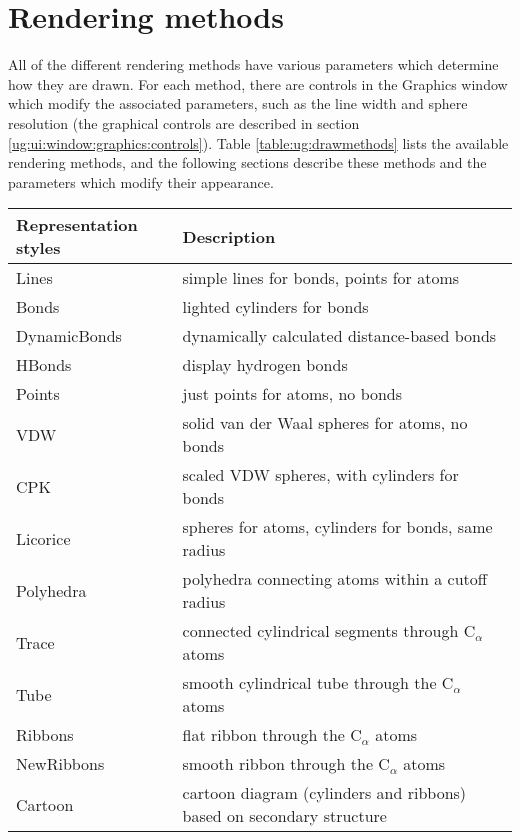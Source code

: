 \section{Rendering methods}
\label{ug:topic:drawmethods}

All of the different rendering methods have various parameters which
determine how they are drawn.  For each method, there are controls in
the Graphics window which modify the associated parameters, such as the
line width and sphere resolution (the graphical controls are described
in section \ref{ug:ui:window:graphics:controls}).  Table
\ref{table:ug:drawmethods} lists the available rendering methods, and
the following sections describe these methods and the
parameters which modify their appearance.

\begin{table}[htb]
  \hspace{0.5in}
  \begin{tabular}{|l|l|} \hline
  Representation styles & Description \\ \hline\hline
  Lines		& simple lines for bonds, points for atoms \\
  Bonds		& lighted cylinders for bonds \\
  DynamicBonds  & dynamically calculated distance-based bonds \\
  HBonds        & display hydrogen bonds \\
  Points	& just points for atoms, no bonds \\
  VDW		& solid van der Waal spheres for atoms, no bonds \\
  CPK		& scaled VDW spheres, with cylinders for bonds \\
  Licorice	& spheres for atoms, cylinders for bonds, same radius \\
  Polyhedra     & polyhedra connecting atoms within a cutoff radius \\
  Trace		& connected cylindrical segments through C${}_\alpha$ atoms \\
  Tube		& smooth cylindrical tube through the C${}_\alpha$ atoms \\
  Ribbons	& flat ribbon through the C${}_\alpha$ atoms \\
  NewRibbons    & smooth ribbon through the C${}_\alpha$ atoms \\
  Cartoon	& cartoon diagram (cylinders and ribbons) based on secondary structure \\

\end{tabular}
\end{table}
